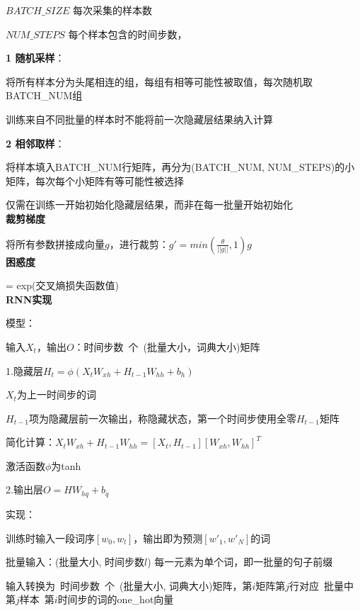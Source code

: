 \documentclass[UTF8]{ctexart}
\begin{document}
  $BATCH\_SIZE$ 每次采集的样本数
  
  $NUM\_STEPS$ 每个样本包含的时间步数，

  \textbf{1 随机采样}：

  \quad [1 2 3 4] [5 6 7 8] [9 10 11 12] [13 14 15 16]

  \quad 将所有样本分为头尾相连的组，每组有相等可能性被取值，每次随机取BATCH\_NUM组

  \quad 训练来自不同批量的样本时不能将前一次隐藏层结果纳入计算
  
  \textbf{2 相邻取样}：

  \quad [1 2 3 4    ] [5 6 7 8    ] [9 10 11 12 ] [13 14 15 16]

  \quad [17 18 19 20] [21 22 23 24] [25 26 27 28] [29 30 31 32]

  \quad 将样本填入BATCH\_NUM行矩阵，再分为(BATCH\_NUM, NUM\_STEPS)的小矩阵，每次每个小矩阵有等可能性被选择
  
  \quad 仅需在训练一开始初始化隐藏层结果，而非在每一批量开始初始化\\
\textbf{裁剪梯度}

  将所有参数拼接成向量$g$，进行裁剪：$g' = min(\frac{\theta}{||g||}, 1)g$\\
\textbf{困惑度}

  = exp(交叉熵损失函数值)\\
\textbf{RNN实现}

  模型：

  \quad 输入$X_t$，输出$O$：时间步数\ 个\ (批量大小，词典大小)矩阵

  \quad 1.隐藏层$H_t = \phi(X_tW_{xh} + H_{t-1}W_{hh} + b_h)$

  \quad \quad $X_t$为上一时间步的词

  \quad \quad $H_{t-1}$项为隐藏层前一次输出，称隐藏状态，第一个时间步使用全零$H_{t-1}$矩阵

  \quad \quad 简化计算：$X_tW_{xh} + H_{t-1}W_{hh} = [X_t, H_{t-1}][W_{xh}, W_{hh}]^T$

  \quad \quad 激活函数$\phi$为tanh

  \quad 2.输出层$O = HW_{hq} + b_q$
  
  实现：

  \quad 训练时输入一段词序$[w_{0}, w_{l}]$，输出即为预测$[w'_{1}, w'_N]$的词
  
  \quad 批量输入：(批量大小, 时间步数$l$) 每一元素为单个词，即一批量的句子前缀
  
  \quad \quad 输入转换为\ 时间步数\ 个\ (批量大小, 词典大小)矩阵，第$i$矩阵第$j$行对应\ 批量中第$j$样本\ 第$i$时间步的词的one\_hot向量
    
\end{document}
